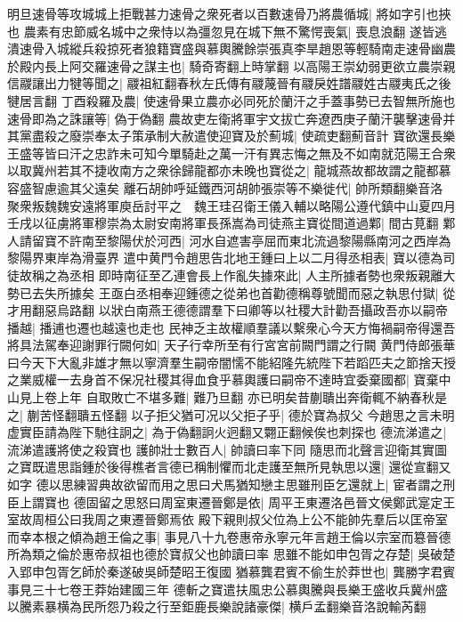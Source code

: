 明旦速骨等攻城城上拒戰甚力速骨之衆死者以百數速骨乃將農循城|{
	將如字引也挾也}
農素有忠節威名城中之衆恃以為彊忽見在城下無不驚愕喪氣|{
	喪息浪翻}
遂皆逃潰速骨入城縱兵殺掠死者狼籍寶盛與慕輿騰餘崇張真李旱趙恩等輕騎南走速骨幽農於殿内長上阿交羅速骨之謀主也|{
	騎奇寄翻上時掌翻}
以高陽王崇幼弱更欲立農崇親信鬷讓出力犍等聞之|{
	鬷祖紅翻春秋左氏傳有鬷蔑晉有鬷戾姓譜鬷姓古鬷夷氏之後犍居言翻}
丁酉殺羅及農|{
	使速骨果立農亦必同死於蘭汗之手蓋事勢已去智無所施也}
速骨即為之誅讓等|{
	偽于偽翻}
農故吏左衛將軍宇文拔亡奔遼西庚子蘭汗襲擊速骨并其黨盡殺之廢崇奉太子策承制大赦遣使迎寶及於薊城|{
	使疏吏翻薊音計}
寶欲還長樂王盛等皆曰汗之忠詐未可知今單騎赴之萬一汗有異志悔之無及不如南就范陽王合衆以取冀州若其不捷收南方之衆徐歸龍都亦未晚也寶從之|{
	龍城燕故都故謂之龍都慕容盛智慮逾其父遠矣}
離石胡帥呼延鐵西河胡帥張崇等不樂徙代|{
	帥所類翻樂音洛}
聚衆叛魏魏安遠將軍庾岳討平之　魏王珪召衛王儀入輔以略陽公遵代鎮中山夏四月壬戌以征虜將軍穆崇為太尉安南將軍長孫嵩為司徒燕主寶從間道過鄴|{
	間古莧翻}
鄴人請留寶不許南至黎陽伏於河西|{
	河水自遮害亭屈而東北流過黎陽縣南河之西岸為黎陽界東岸為滑臺界}
遣中黄門令趙思告北地王鍾曰上以二月得丞相表|{
	寶以德為司徒故稱之為丞相}
即時南征至乙連會長上作亂失據來此|{
	人主所據者勢也衆叛親離大勢已去失所據矣}
王亟白丞相奉迎鍾德之從弟也首勸德稱尊號聞而惡之執思付獄|{
	從才用翻惡烏路翻}
以狀白南燕王德德謂羣下曰卿等以社稷大計勸吾攝政吾亦以嗣帝播越|{
	播逋也遷也越遠也走也}
民神乏主故權順羣議以繫衆心今天方悔禍嗣帝得還吾將具法駕奉迎謝罪行闕何如|{
	天子行幸所至有行宮宮前闕門謂之行闕}
黄門侍郎張華曰今天下大亂非雄才無以寧濟羣生嗣帝闇懦不能紹隆先統陛下若蹈匹夫之節捨天授之業威權一去身首不保况社稷其得血食乎慕輿護曰嗣帝不達時宜委棄國都|{
	寶棄中山見上卷上年}
自取敗亡不堪多難|{
	難乃旦翻}
亦已明矣昔蒯聵出奔衛輒不納春秋是之|{
	蒯苦怪翻聵五怪翻}
以子拒父猶可况以父拒子乎|{
	德於寶為叔父}
今趙思之言未明虚實臣請為陛下馳往詗之|{
	為于偽翻詗火迥翻又翾正翻候俟也刺探也}
德流涕遣之|{
	流涕遣護將使之殺寶也}
護帥壯士數百人|{
	帥讀曰率下同}
隨思而北聲言迎衛其實圖之寶既遣思詣鍾於後得樵者言德已稱制懼而北走護至無所見執思以還|{
	還從宣翻又如字}
德以思練習典故欲留而用之思曰犬馬猶知戀主思雖刑臣乞還就上|{
	宦者謂之刑臣上謂寶也}
德固留之思怒曰周室東遷晉鄭是依|{
	周平王東遷洛邑晉文侯鄭武寔定王室故周桓公曰我周之東遷晉鄭焉依}
殿下親則叔父位為上公不能帥先羣后以匡帝室而幸本根之傾為趙王倫之事|{
	事見八十九卷惠帝永寧元年言趙王倫以宗室而簒晉德所為類之倫於惠帝叔祖也德於寶叔父也帥讀曰率}
思雖不能如申包胥之存楚|{
	吳破楚入郢申包胥乞師於秦遂破吳師楚昭王復國}
猶慕龔君賓不偷生於莽世也|{
	龔勝字君賓事見三十七卷王莽始建國三年}
德斬之寶遣扶風忠公慕輿騰與長樂王盛收兵冀州盛以騰素暴横為民所怨乃殺之行至鉅鹿長樂說諸豪傑|{
	横戶孟翻樂音洛說輸芮翻}
